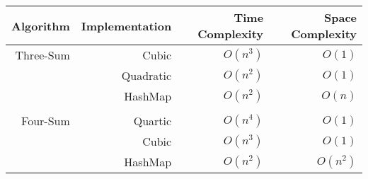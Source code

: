 \begin{tabular}{rrrr}
    Algorithm & Implementation & Time Complexity & Space Complexity \\\hline
    Three-Sum & Cubic & $O(n^3)$ & $O(1)$\\
             & Quadratic & $O(n^2)$ & $O(1)$\\
             & HashMap & $O(n^2)$ & $O(n)$\\\\\hline
    Four-Sum & Quartic & $O(n^4)$ & $O(1)$\\
     & Cubic & $O(n^3)$ & $O(1)$\\
     & HashMap & $O(n^2)$ & $O(n^2)$\\
\end{tabular}
    